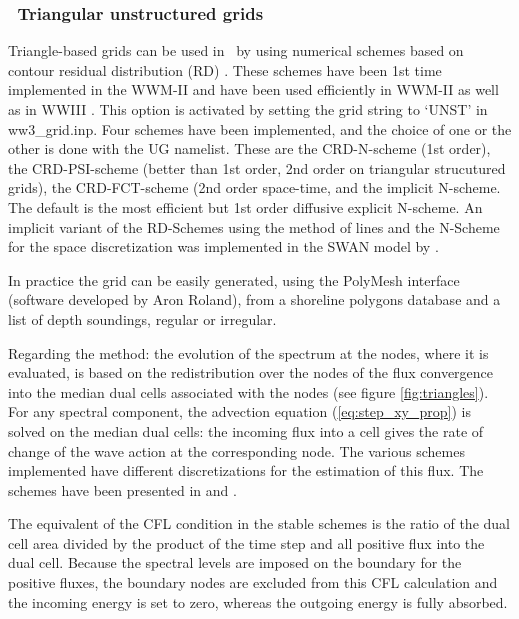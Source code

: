 \vssub
\subsubsection{~Triangular unstructured grids} \label{sub:num_space_tri}

\noindent Triangle-based grids can be used in \ws\ by using numerical schemes
based on contour residual distribution (RD) \citep[see][for a
review]{rep:Roland2008}.  These schemes have been 1st time implemented in the 
WWM-II and have been used efficiently in WWM-II as well as in WWIII \citep[e.g.][]{art:Aea09,Magne2010}.
This option is activated by setting the grid string
to `{\code UNST}' in {\file ww3\_grid.inp}.  Four schemes have been
implemented, and the choice of one or the other is done with the {\code UG}
namelist.  These are the CRD-N-scheme (1st order), the CRD-PSI-scheme 
(better than 1st order, 2nd order on triangular strucutured grids), 
the CRD-FCT-scheme (2nd order space-time, and
the implicit N-scheme. The default is the most efficient but 1st order 
diffusive explicit N-scheme. An implicit variant of the RD-Schemes using the method of lines
and the N-Scheme for the space discretization was implemented in the SWAN model by \citet{Zijlema2010267}.

In practice the grid can be easily generated, using the PolyMesh interface
(software developed by Aron Roland), from a shoreline polygons database
\citep[e.g.][]{art:WS96} and a list of depth soundings, regular or irregular.

Regarding the method: the evolution of the spectrum at the nodes, where it is
evaluated, is based on the redistribution over the nodes of the flux
convergence into the median dual cells associated with the nodes (see figure
\ref{fig:triangles}).  For any spectral component, the advection equation
(\ref{eq:step_xy_prop}) is solved on the median dual cells: the incoming flux
into a cell gives the rate of change of the wave action at the corresponding
node. The various schemes implemented have different discretizations for the
estimation of this flux. The schemes have been presented in \citep[see][for a
review]{rep:Roland2008} and \citet{RolandECMWF}.

The equivalent of the CFL condition in the stable schemes is the ratio of the
dual cell area divided by the product of the time step and all positive flux
into the dual cell. Because the spectral levels are imposed on the boundary
for the positive fluxes, the boundary nodes are excluded from this CFL
calculation and the incoming energy is set to zero, whereas the outgoing energy 
is fully absorbed. 

